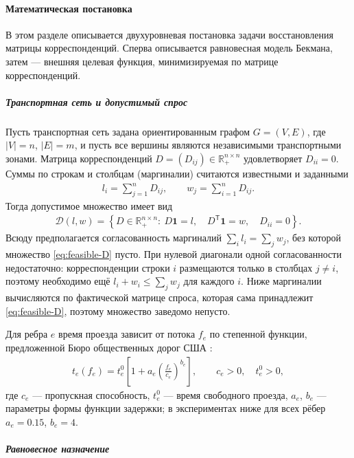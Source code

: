 \documentclass{crm-article}
\begin{document}
\paragraph{Математическая постановка}

В этом разделе описывается двухуровневая постановка задачи восстановления
матрицы корреспонденций. Сперва описывается равновесная модель Бекмана,
затем --- внешняя целевая функция, минимизируемая по матрице
корреспонденций.

\subparagraph{Транспортная сеть и допустимый спрос}

Пусть транспортная сеть задана ориентированным графом
$G=(V,E)$, где $|V|=n$, $|E|=m$, и пусть все вершины являются
независимыми транспортными зонами. Матрица корреспонденций
$D=(D_{ij})\in\mathbb{R}^{n\times n}_{+}$ удовлетворяет $D_{ii}=0$.
Суммы по строкам и столбцам (маргиналии) считаются известными и заданными
\begin{gather}
 l_i=\sum\limits_{j=1}^{n}D_{ij},\qquad
 w_j=\sum\limits_{i=1}^{n}D_{ij}.
 \label{eq:marginals}
\end{gather}
Тогда допустимое множество имеет вид
\begin{gather}
 \mathcal{D}(l,w)=\left\{D\in\mathbb{R}^{n\times n}_{+}:\
 D\boldsymbol{1}=l,\quad D^{\mathsf T}\boldsymbol{1}=w,\quad
 D_{ii}=0\right\}.
 \label{eq:feasible-D}
\end{gather}
Всюду предполагается согласованность маргиналий
$\sum_{i}l_i=\sum_{j}w_j$, без которой множество \eqref{eq:feasible-D}
пусто. При нулевой диагонали одной согласованности недостаточно:
корреспонденции строки $i$ размещаются только в столбцах $j\ne i$, поэтому
необходимо ещё $l_i+w_i\le\sum_{j}w_j$ для каждого $i$. Ниже маргиналии
вычисляются по фактической матрице спроса, которая сама принадлежит
\eqref{eq:feasible-D}, поэтому множество заведомо непусто.

Для ребра $e$ время проезда зависит от потока $f_e$ по степенной функции,
предложенной Бюро общественных дорог США \cite{BPR1964}:
\begin{gather}
 t_e(f_e)=t^0_e\left[1+a_e\left(\frac{f_e}{c_e}\right)^{b_e}\right],
 \qquad c_e>0,\quad t^0_e>0,
 \label{eq:bpr}
\end{gather}
где $c_e$ --- пропускная способность, $t^0_e$ --- время свободного
проезда, $a_e$, $b_e$ --- параметры формы функции задержки; в
экспериментах ниже для всех рёбер $a_e=0.15$, $b_e=4$.

\subparagraph{Равновесное назначение}
\end{document}
